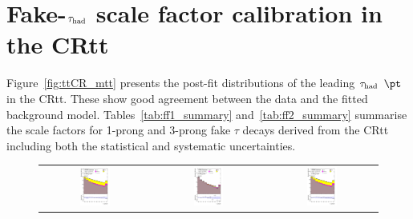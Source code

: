 \section{Fake-$\tau_\text{had}$ scale factor calibration in the CRtt}
\label{sec:tauFF_appendix}

Figure~\ref{fig:ttCR_mtt} presents the post-fit distributions of the leading $\tau_\text{had}$ $\pt$ in the CRtt. These show good agreement between the data and the fitted background model.
Tables~\ref{tab:ff1_summary} and~\ref{tab:ff2_summary} summarise the scale factors for 1-prong and 3-prong fake $\tau$ decays
derived from the CRtt including both the statistical and systematic uncertainties. 

\begin{figure}[H]
\centering
\begin{tabular}{@{}ccc@{}}
\includegraphics[page=1,width=0.29\textwidth]{figures/ttCR/tuH_reg1l1tau2b2j_os_log_ttCR.pdf} &
\includegraphics[page=1,width=0.29\textwidth]{figures/ttCR/tuH_reg1l1tau2b2j_ss_log_ttCR.pdf}&
\includegraphics[page=1,width=0.29\textwidth]{figures/ttCR/tuH_reg1l1tau2b3j_os_log_ttCR.pdf}\\

\end{tabular}
\end{figure}

